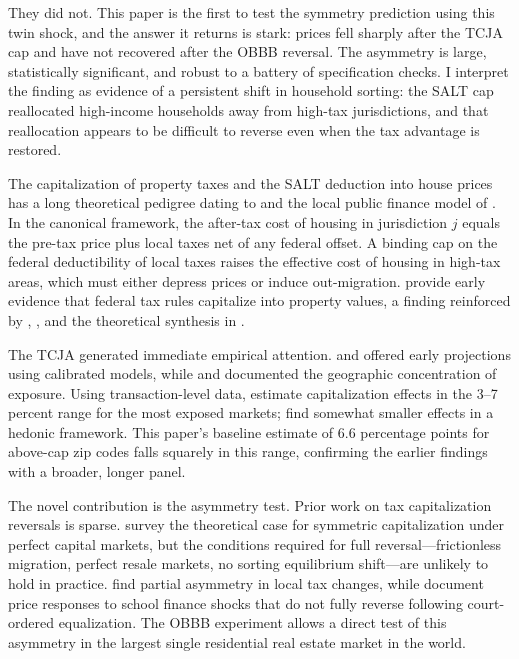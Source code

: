\documentclass[12pt]{article}
\begin{document}
They did not. This paper is the first to test the symmetry prediction using this twin shock, and the answer it returns is stark: prices fell sharply after the TCJA cap and have not recovered after the OBBB reversal. The asymmetry is large, statistically significant, and robust to a battery of specification checks. I interpret the finding as evidence of a persistent shift in household sorting: the SALT cap reallocated high-income households away from high-tax jurisdictions, and that reallocation appears to be difficult to reverse even when the tax advantage is restored.

The capitalization of property taxes and the SALT deduction into house prices has a long theoretical pedigree dating to \citet{Oates1969} and the local public finance model of \citet{TieboutSamuels1956}. In the canonical framework, the after-tax cost of housing in jurisdiction $j$ equals the pre-tax price plus local taxes net of any federal offset. A binding cap on the federal deductibility of local taxes raises the effective cost of housing in high-tax areas, which must either depress prices or induce out-migration. \citet{Gyourko1991} provide early evidence that federal tax rules capitalize into property values, a finding reinforced by \citet{Poterba1984}, \citet{Poterba1992}, and the theoretical synthesis in \citet{GlaeserShapiro2003}.

The TCJA generated immediate empirical attention. \citet{Kueng2018} and \citet{Sommer2018} offered early projections using calibrated models, while \citet{Schuetz2018} and \citet{Gyourko2020} documented the geographic concentration of exposure. Using transaction-level data, \citet{Kuminoff2020} estimate capitalization effects in the 3--7 percent range for the most exposed markets; \citet{ZoecklerSommer2022} find somewhat smaller effects in a hedonic framework. This paper's baseline estimate of 6.6 percentage points for above-cap zip codes falls squarely in this range, confirming the earlier findings with a broader, longer panel.

The novel contribution is the asymmetry test. Prior work on tax capitalization reversals is sparse. \citet{AuersbachHines2002} survey the theoretical case for symmetric capitalization under perfect capital markets, but the conditions required for full reversal---frictionless migration, perfect resale markets, no sorting equilibrium shift---are unlikely to hold in practice. \citet{FischeBates1998} find partial asymmetry in local tax changes, while \citet{Cellini2010} document price responses to school finance shocks that do not fully reverse following court-ordered equalization. The OBBB experiment allows a direct test of this asymmetry in the largest single residential real estate market in the world.
\end{document}
